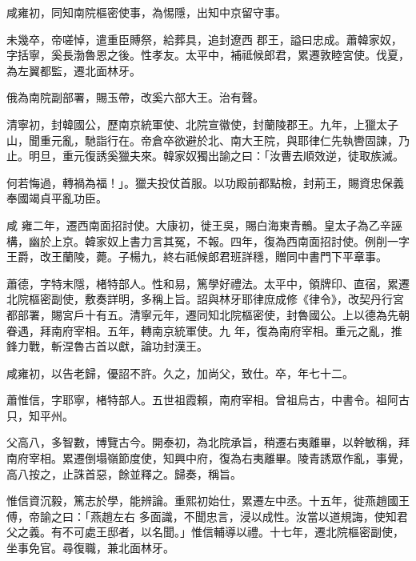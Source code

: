 \begin{pinyinscope}
 咸雍初，同知南院樞密使事，為惕隱，出知中京留守事。



 未幾卒，帝嗟悼，遣重臣賻祭，給葬具，追封遼西
 郡王，謚曰忠成。蕭韓家奴，字括寧，奚長渤魯恩之後。性孝友。太平中，補祗候郎君，累遷敦睦宮使。伐夏，為左翼都監，遷北面林牙。



 俄為南院副部署，賜玉帶，改奚六部大王。治有聲。



 清寧初，封韓國公，歷南京統軍使、北院宣徽使，封蘭陵郡王。九年，上獵太子山，聞重元亂，馳詣行在。帝倉卒欲避於北、南大王院，與耶律仁先執轡固諫，乃止。明旦，重元復誘奚獵夫來。韓家奴獨出諭之曰：「汝曹去順效逆，徒取族滅。



 何若悔過，轉禍為福！」。獵夫投仗首服。以功殿前都點檢，封荊王，賜資忠保義奉國竭貞平亂功臣。



 咸
 雍二年，遷西南面招討使。大康初，徙王吳，賜白海東青鶻。皇太子為乙辛誣構，幽於上京。韓家奴上書力言其冤，不報。四年，復為西南面招討使。例削一字王爵，改王蘭陵，薨。子楊九，終右祗候郎君班詳穩，贈同中書門下平章事。



 蕭德，字特末隱，楮特部人。性和易，篤學好禮法。太平中，領牌印、直宿，累遷北院樞密副使，敷奏詳明，多稱上旨。詔與林牙耶律庶成修《律令》，改契丹行宮都部署，賜宮戶十有五。清寧元年，遷同知北院樞密使，封魯國公。上以德為先朝眷遇，拜南府宰相。五年，轉南京統軍使。九
 年，復為南府宰相。重元之亂，推鋒力戰，斬涅魯古首以獻，論功封漢王。



 咸雍初，以告老歸，優詔不許。久之，加尚父，致仕。卒，年七十二。



 蕭惟信，字耶寧，楮特部人。五世祖霞賴，南府宰相。曾祖烏古，中書令。祖阿古只，知平州。



 父高八，多智數，博覽古今。開泰初，為北院承旨，稍遷右夷離畢，以幹敏稱，拜南府宰相。累遷倒塌嶺節度使，知興中府，復為右夷離畢。陵青誘眾作亂，事覺，高八按之，止誅首惡，餘並釋之。歸奏，稱旨。



 惟信資沉毅，篤志於學，能辨論。重熙初始仕，累遷左中丞。十五年，徙燕趙國王傅，帝諭之曰：「燕趙左右
 多面識，不聞忠言，浸以成性。汝當以道規誨，使知君父之義。有不可處王邸者，以名聞。」惟信輔導以禮。十七年，遷北院樞密副使，坐事免官。尋復職，兼北面林牙。




\end{pinyinscope}

